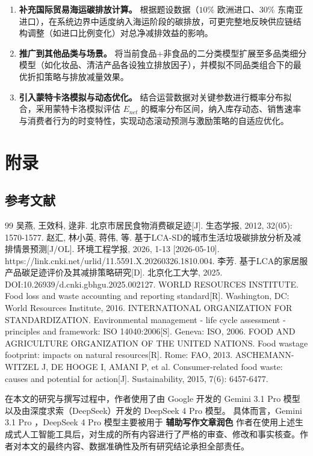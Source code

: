\documentclass{article}
\begin{document}
\begin{enumerate}
    \item \textbf{补充国际贸易海运碳排放计算。} 根据题设数据（$10\%$ 欧洲进口、$30\%$ 东南亚进口），在系统边界中适度纳入海运阶段的碳排放，可更完整地反映供应链结构调整（如进口比例变化）对总净减排效益的影响。
    \item \textbf{推广到其他品类与场景。} 将当前食品+非食品的二分类模型扩展至多品类细分模型（如化妆品、清洁产品各设独立排放因子），并模拟不同品类组合下的最优折扣策略与排放减量效果。
    \item \textbf{引入蒙特卡洛模拟与动态优化。} 结合运营数据对关键参数进行概率分布拟合，采用蒙特卡洛模拟评估 $E_{net}$ 的概率分布区间，纳入库存动态、销售速率与消费者行为的时变特性，实现动态滚动预测与激励策略的自适应优化。
\end{enumerate}



\section*{附录}

\subsection{参考文献}

\begin{thebibliography}{99}
 吴燕, 王效科, 逯非. 北京市居民食物消费碳足迹[J]. 生态学报, 2012, 32(05): 1570-1577.
 赵汇, 林小英, 蒋伟, 等. 基于LCA-SD的城市生活垃圾碳排放分析及减排情景预测[J/OL]. 环境工程学报, 2026, 1-13 [2026-05-10]. https://link.cnki.net/urlid/11.5591.X.20260326.1810.004.
 李芳. 基于LCA的家居服产品碳足迹评价及其减排策略研究[D]. 北京化工大学, 2025. DOI:10.26939/d.cnki.gbhgu.2025.002127.
 WORLD RESOURCES INSTITUTE. Food loss and waste accounting and reporting standard[R]. Washington, DC: World Resources Institute, 2016.
 INTERNATIONAL ORGANIZATION FOR STANDARDIZATION. Environmental management - life cycle assessment - principles and framework: ISO 14040:2006[S]. Geneva: ISO, 2006.
 FOOD AND AGRICULTURE ORGANIZATION OF THE UNITED NATIONS. Food wastage footprint: impacts on natural resources[R]. Rome: FAO, 2013.
 ASCHEMANN-WITZEL J, DE HOOGE I, AMANI P, et al. Consumer-related food waste: causes and potential for action[J]. Sustainability, 2015, 7(6): 6457-6477.
\end{thebibliography}
在本文的研究与撰写过程中，作者使用了由 Google 开发的 Gemini 3.1 Pro 模型以及由深度求索（DeepSeek）开发的 DeepSeek 4 Pro 模型。
具体而言，Gemini 3.1 Pro ，DeepSeek 4 Pro 模型主要被用于 \textbf{辅助写作文章润色}
作者在使用上述生成式人工智能工具后，对生成的所有内容进行了严格的审查、修改和事实核查。作者对本文的最终内容、数据准确性及所有研究结论承担全部责任。
\end{document}
